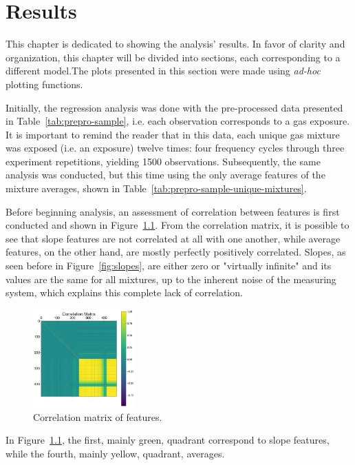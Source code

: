 \chapter{Results}
\label{cha:results}

This chapter is dedicated to showing the analysis' results. In favor of clarity and organization, this chapter will be divided into sections, each corresponding to a different model.The plots presented in this section were made using \textit{ad-hoc} plotting functions.

Initially, the regression analysis was done with the pre-processed data presented in Table~\ref{tab:prepro-sample}, i.e. each observation corresponds to a gas exposure. It is important to remind the reader that in this data, each unique gas mixture was exposed (i.e. an exposure) twelve times: four frequency cycles through three experiment repetitions, yielding 1500 observations. Subsequently, the same analysis was conducted, but this time using the only average features of the mixture averages, shown in Table~\ref{tab:prepro-sample-unique-mixtures}.

Before beginning analysis, an assessment of correlation between features is first conducted and shown in Figure~\ref{fig:cor-mat}. From the correlation matrix, it is possible to see that slope features are not correlated at all with one another, while average features, on the other hand, are mostly perfectly positively correlated. Slopes, as seen before in Figure~\ref{fig:slopes}, are either zero or "virtually infinite" and its values are the same for all mixtures, up to the inherent noise of the measuring system, which explains this complete lack of correlation.

\begin{figure}[h]
	\centering
	\includegraphics[width=0.35\textwidth]{../figures/correlation-matrix.png}
	\caption{Correlation matrix of features.}
	
	\label{fig:cor-mat}
\end{figure}

In Figure~\ref{fig:cor-mat}, the first, mainly green, quadrant correspond to slope features, while the fourth, mainly yellow, quadrant, averages.

